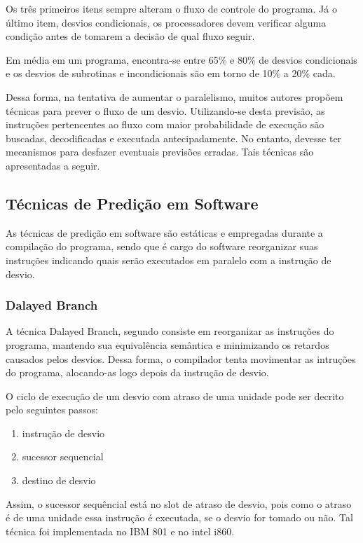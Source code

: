 \documentclass[12pt]{article}
\begin{document}
Os três primeiros itens sempre alteram o fluxo de controle do programa. Já o último item, desvios condicionais, os processadores devem verificar alguma condição antes de tomarem a decisão de qual fluxo seguir.

Em média em um programa, encontra-se entre 65\% e 80\% de desvios condicionais e os desvios de subrotinas e incondicionais são em torno de 10\% a 20\% cada.

Dessa forma, na tentativa de aumentar o paralelismo, muitos autores propõem técnicas para prever o fluxo de um desvio. Utilizando-se desta previsão, as instruções pertencentes ao fluxo com maior probabilidade de execução são buscadas, decodificadas e executada antecipadamente. No entanto, devesse ter mecanismos para desfazer eventuais previsões erradas. Tais técnicas são apresentadas a seguir.

\subsection{Técnicas de Predição em Software}

As técnicas de predição em software são estáticas e empregadas durante a compilação do programa, sendo que é cargo do software reorganizar suas instruções indicando quais serão executados em paralelo com a instrução de desvio.

\subsubsection{Dalayed Branch}

A técnica Dalayed Branch, segundo \cite{predicaoDaltio} consiste em reorganizar as instruções do programa, mantendo sua equivalência semântica e minimizando os retardos causados pelos desvios. Dessa forma, o compilador tenta movimentar as intruções do programa, alocando-as logo depois da instrução de desvio. 

O ciclo de execução de um desvio com atraso de uma unidade pode ser decrito pelo seguintes passos:

\begin{enumerate}
	\item instrução de desvio
	\item sucessor sequencial
	\item destino de desvio
\end{enumerate}

Assim, o sucessor sequêncial está no slot de atraso de desvio, pois como o atraso é de uma unidade essa instrução é executada, se o desvio for tomado ou não. Tal técnica foi implementada no IBM 801 e no intel i860.
\end{document}
